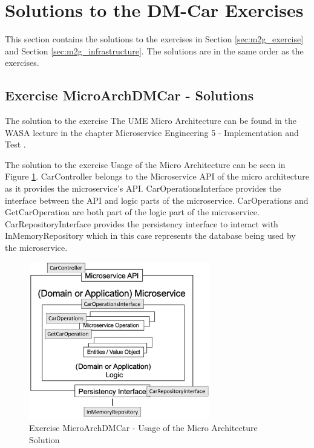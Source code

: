 \section{Solutions to the DM-Car Exercises}
\label{sec:m2g_solutions}

This section contains the solutions to the exercises in Section \ref{sec:m2g_exercise}
and Section \ref{sec:m2g_infrastructure}. The solutions are in the same order as the exercises.

\subsection*{Exercise MicroArchDMCar - Solutions}

The solution to the exercise The UME Micro Architecture can be found in the WASA lecture in the
chapter Microservice Engineering 5 - Implementation and Test \cite{CM-W-IMP}.

The solution to the exercise Usage of the Micro Architecture can be seen in Figure \ref{fig:m2go_solution_1_2}.
CarController belongs to the Microservice API of the micro architecture as it provides the microservice's API.
CarOperationsInterface provides the interface between the API and logic parts of the microservice.
CarOperations and GetCarOperation are both part of the logic part of the microservice.
CarRepositoryInterface provides the persistency interface to interact with InMemoryRepository
which in this case represents the database being used by the microservice.

\begin{figure}[tb]
	\centering
	\includegraphics[width=0.7\textwidth]{figures/8.14_m2go_solution_1_2.png}
	\caption{Exercise MicroArchDMCar - Usage of the Micro Architecture Solution}
	\label{fig:m2go_solution_1_2}
\end{figure}

